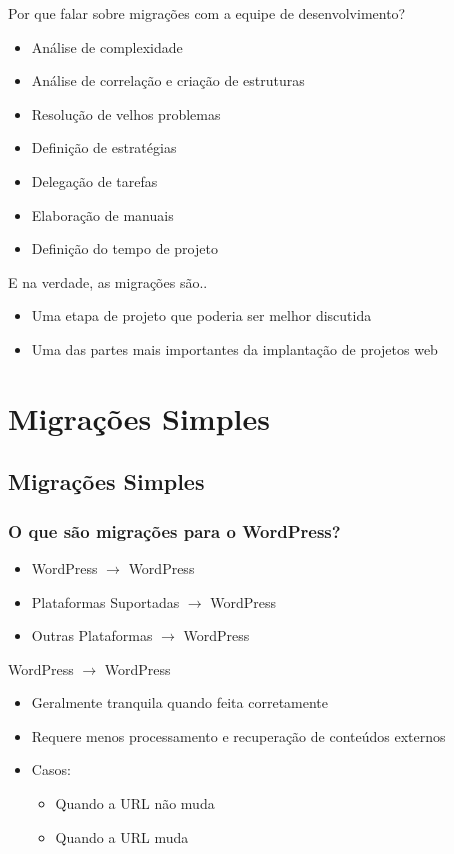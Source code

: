 \documentclass[handout]{beamer}
\begin{document}
\begin{frame}{Por que falar sobre migrações com a equipe de desenvolvimento?}
\begin{itemize}
  \pause \item Análise de complexidade
  \pause \item Análise de correlação e criação de estruturas
  \pause \item Resolução de velhos problemas
  \pause \item Definição de estratégias
  \pause \item Delegação de tarefas
  \pause \item Elaboração de manuais
  \pause \item Definição do tempo de projeto
\end{itemize}
\end{frame}

\begin{frame}{E na verdade, as migrações são..}
\begin{itemize}
  \pause \item Uma etapa de projeto que poderia ser melhor discutida
  \pause \item Uma das partes mais importantes da implantação de projetos web
\end{itemize}
\end{frame}

\section{Migrações Simples}
\subsection{Migrações Simples}

\begin{frame}
\frametitle{O que são migrações para o WordPress?}
\begin{itemize}
  \pause \item WordPress $\rightarrow$ WordPress
  \pause \item Plataformas Suportadas $\rightarrow$ WordPress
  \pause \item Outras Plataformas $\rightarrow$ WordPress
\end{itemize}
\end{frame}

\begin{frame}{WordPress $\rightarrow$ WordPress}
\begin{itemize}
  \pause \item Geralmente tranquila quando feita corretamente
  \pause \item Requere menos processamento e recuperação de conteúdos
               externos
  \pause \item Casos:
    \begin{itemize}
      \pause \item Quando a URL não muda
      \pause \item Quando a URL muda
    \end{itemize}
\end{itemize}
\end{frame}
\end{document}
